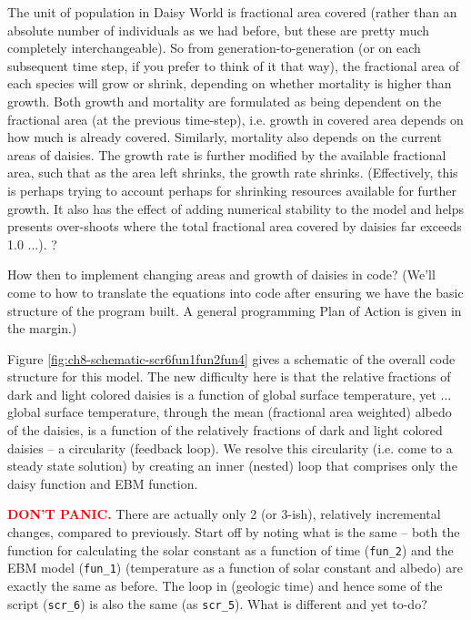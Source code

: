 \documentclass{tufte-book} %
\begin{document}
The unit of population in Daisy World is fractional area covered (rather than an absolute number of individuals as we had before, but these are pretty much completely interchangeable). So from generation-to-generation (or on each subsequent time step, if you prefer to think of it that way), the fractional area of each species will grow or shrink, depending on whether mortality is higher than growth. Both growth and mortality are formulated as being dependent on the fractional area (at the previous time-step), i.e. growth in covered area depends on how much is already covered. Similarly, mortality also depends on the current areas of daisies. The growth rate is further modified by the available fractional area, such that as the area left shrinks, the growth rate shrinks. (Effectively, this is perhaps trying to account perhaps for shrinking resources available for further growth. It also has the effect of adding numerical stability to the model and helps presents over-shoots where the total fractional area covered by daisies far exceeds 1.0 ...). 
?

How then to implement changing areas and growth of daisies in code? (We'll come to how to translate the equations into code after ensuring we have the basic structure of the program built. A general programming Plan of Action is given in the margin.)

Figure \ref{fig:ch8-schematic-scr6fun1fun2fun4} gives a schematic of the overall code structure for this model. The new difficulty here is that the relative fractions of dark and light colored daisies is a function of global surface temperature, yet ... global surface temperature, through the mean (fractional area weighted) albedo of the daisies, is a function of the relatively fractions of dark and light colored daisies -- a circularity (feedback loop). We resolve this circularity (i.e. come to a steady state solution) by creating an inner (nested) loop that comprises only the daisy function and EBM function.

\textbf{\textcolor{red}{DON'T PANIC.}} There are actually only 2 (or 3-ish), relatively incremental changes, compared to previously. Start off by noting what is the same -- both the function for calculating the solar constant as a function of time (\texttt{fun\_2}) and the EBM model (\texttt{fun\_1}) (temperature as a function of solar constant and albedo) are exactly the same as before. The loop in (geologic time) and hence some of the script (\texttt{scr\_6}) is also the same (as \texttt{scr\_5}). What is different and yet to-do?
\end{document}
